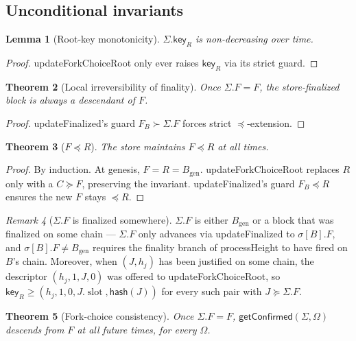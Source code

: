 \documentclass{article}
\newcommand{\genesis}{\ensuremath{B_{\mathrm{gen}}}}
\newcommand{\slot}{\operatorname{\mathrm{slot}}}
\newcommand{\hash}{\mathsf{hash}}
\newcommand{\key}{\mathsf{key}}
\newcommand{\processHeight}{\textsf{processHeight}\xspace}
\newcommand{\updateForkChoiceRoot}{\textsf{updateForkChoiceRoot}\xspace}
\newcommand{\updateFinalized}{\textsf{updateFinalized}\xspace}
\newcommand{\getConfirmed}{\textsf{getConfirmed}\xspace}
\theoremstyle{plain}
\newtheorem{theorem}{Theorem}
\newtheorem{lemma}[theorem]{Lemma}
\theoremstyle{definition}
\theoremstyle{remark}
\newtheorem{remark}[theorem]{Remark}
\begin{document}
\subsection{Unconditional invariants}

\begin{lemma}[Root-key monotonicity]\label{lem:Rs-key-monotone}
$\Sigma.\key_R$ is non-decreasing over time.
\end{lemma}

\begin{proof}[Proof] \updateForkChoiceRoot only ever raises $\key_R$ via its strict guard. \end{proof}

\begin{theorem}[Local irreversibility of finality]\label{thm:finperm}
Once $\Sigma.F = F$, the store-finalized block is always a descendant of $F$.
\end{theorem}

\begin{proof}[Proof] \updateFinalized's guard $F_B \succ \Sigma.F$ forces strict $\preceq$-extension. \end{proof}

\begin{theorem}[$F \preceq R$]\label{thm:fleqr}
The store maintains $F \preceq R$ at all times.
\end{theorem}

\begin{proof}[Proof]
By induction. At genesis, $F = R = \genesis$. \updateForkChoiceRoot replaces $R$ only with a $C \succeq F$, preserving the invariant. \updateFinalized's guard $F_B \preceq R$ ensures the new $F$ stays $\preceq R$.
\end{proof}

\begin{remark}[$\Sigma.F$ is finalized somewhere]\label{rem:fs-invariant}
$\Sigma.F$ is either $\genesis$ or a block that was finalized on some chain --- $\Sigma.F$ only advances via \updateFinalized to $\sigma[B].F$, and $\sigma[B].F \neq \genesis$ requires the finality branch of \processHeight to have fired on $B$'s chain. Moreover, when $(J, h_j)$ has been justified on some chain, the descriptor $(h_j, 1, J, 0)$ was offered to \updateForkChoiceRoot, so $\key_R \geq (h_j, 1, 0, J.\slot, \hash(J))$ for every such pair with $J \succeq \Sigma.F$.
\end{remark}

\begin{theorem}[Fork-choice consistency]\label{thm:fcconsistency}
Once $\Sigma.F = F$, $\getConfirmed(\Sigma, \Omega)$ descends from $F$ at all future times, for every $\Omega$.
\end{theorem}
\end{document}
